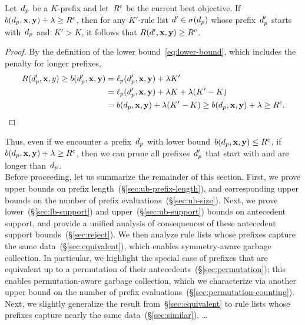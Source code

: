 \begin{lemma}
\label{lemma:lookahead}
Let~$d_p$ be a $K$-prefix
and let~${R^c}$ be the current best objective.
%
If ${b(d_p, \mathbf{x}, \mathbf{y}) + {\lambda} \ge {R^c}}$,
then for any $K'$-rule list ${{d}' \in \sigma(d_p)}$
whose prefix~$d_p'$ starts with~$d_p$ and~${K' > K}$,
it follows that ${R({d}', \mathbf{x}, \mathbf{y}) \ge {R^c}}$.
\end{lemma}

\begin{proof}
By the definition of the lower bound~\eqref{eq:lower-bound},
which includes the penalty for longer prefixes,
\begin{align}
\Obj(\Prefix', \x, y) \ge b(\Prefix', \x, \y) &= \Loss_p(\Prefix', \x, \y) + \Reg K' \nn \\
&= \Loss_p(\Prefix', \x, \y) + \Reg K + \Reg (K' - K) \nn \\
&= b(\Prefix, \x, \y) + \Reg (K' - K)
\ge b(\Prefix, \x, \y) + \Reg \ge \CurrentObj.
\label{eq:lookahead}
\end{align}
\end{proof}

Thus, even if we encounter a prefix~$d_p$
with lower bound~${b(d_p, \mathbf{x}, \mathbf{y}) \le {R^c}}$,
if ${b(d_p, \mathbf{x}, \mathbf{y}) + {\lambda} \ge {R^c}}$, then we can prune
all prefixes~$d_p'$ that start with and are longer than~$d_p$. \\

Before proceeding, let us summarize the remainder of this section.
%
First, we prove upper bounds on prefix
length~(\S\ref{sec:ub-prefix-length}),
and corresponding upper bounds on the number of
prefix evaluations~(\S\ref{sec:ub-size}).
%
Next, we prove lower~(\S\ref{sec:lb-support}) and
upper~(\S\ref{sec:ub-support}) bounds on antecedent support,
and provide a unified analysis of consequences of
these antecedent support bounds~(\S\ref{sec:reject}).
%
We then analyze rule lists whose prefixes
capture the same data~(\S\ref{sec:equivalent}),
which enables symmetry-aware garbage collection.
%
In particular, we highlight the special case of prefixes
that are equivalent up to a permutation of their
antecedents~(\S\ref{sec:permutation});
this enables permutation-aware garbage collection,
which we characterize via another upper bound on
the number of prefix evaluations~(\S\ref{sec:permutation-counting}).
%
Next, we slightly generalize the result from~\S\ref{sec:equivalent}
to rule lists whose prefixes capture nearly the same data~(\S\ref{sec:similar}).
%
\dots

